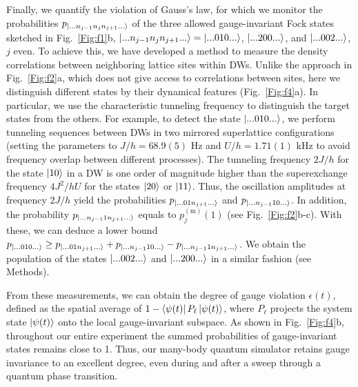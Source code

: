 \documentclass[aps,prl,twocolumn,superscriptaddress,footinbib,linenumbers]{revtex4}
\begin{document}
Finally, we quantify the violation of Gauss's law, for which we monitor the probabilities $p_{\ket{...n_{j-1} n_{j} n_{j+1}...}}$ of the three allowed gauge-invariant Fock states sketched in Fig.~\ref{Fig:f1}b, $\ket{...n_{j-1} n_{j} n_{j+1}...}=\ket{...010...}$, $\ket{...200...}$, and $\ket{...002...}$, $j$ even. To achieve this, we have developed a method to measure the density correlations between neighboring lattice sites within DWs. Unlike the approach in Fig.~\ref{Fig:f2}a, which does not give access to correlations between sites, here we distinguish different states by their dynamical features (Fig.~\ref{Fig:f4}a). In particular, we use the characteristic tunneling frequency to distinguish the target states from the others. For example, to detect the state $\ket{...010...}$, we perform tunneling sequences between DWs in two mirrored superlattice configurations (setting the parameters to $J/h = 68.9(5)$ Hz and $U/h = 1.71(1)$ kHz to avoid frequency overlap between different processes). The tunneling frequency $2J/h$ for the state $\ket{10}$ in a DW %
is one order of magnitude higher than the superexchange frequency $4J^2/hU$ for the states $\ket{20}$ or $\ket{11}$. Thus, the oscillation amplitudes at frequency $2J/h$ yield the probabilities $p_{\ket{...01n_{j+1}...}}$ and $p_{\ket{...n_{j-1}10...}}$. In addition, the probability $p_{\ket{...n_{j-1}1n_{j+1}...}}$ equals to $p_j^{\mathrm{(m)}}(1)$ (see Fig.~\ref{Fig:f2}b-c). With these, we can deduce a lower bound $p_{\ket{...010...}} \geq  p_{\ket{...01n_{j+1}...}} + p_{\ket{...n_{j-1}10...}} - p_{\ket{...n_{j-1}1n_{j+1}...}}$.
We obtain the population of the states $\ket{...002...}$ and $\ket{...200...}$ in a similar fashion (see Methods).

From these measurements, we can obtain the degree of gauge violation $\epsilon(t)$, defined as the spatial average of $1- \bra{\psi(t)}P_{\ell}\ket{\psi(t)}$, where $P_{\ell}$ projects the system state $\ket{\psi(t)}$ onto the local gauge-invariant subspace. As shown in Fig.~\ref{Fig:f4}b, throughout our entire experiment the summed probabilities of gauge-invariant states remains close to 1. Thus, our many-body quantum simulator retains gauge invariance to an excellent degree, even during and after a sweep through a quantum phase transition.

\
\
\end{document}

